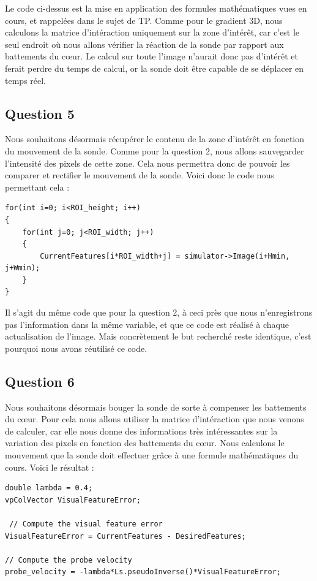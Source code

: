 \documentclass[a4paper,11pt]{article}
\begin{document}
Le code ci-dessus est la mise en application des formules math\'ematiques vues en cours, et rappel\'ees dans le sujet de TP. Comme pour le gradient 3D, nous calculons la matrice d'int\'eraction uniquement sur la zone d'int\'er\^et, car c'est le seul endroit o\`u nous allons v\'erifier la r\'eaction de la sonde par rapport aux battements du c\oe ur. Le calcul sur toute l'image n'aurait donc pas d'int\'er\^et et ferait perdre du temps de calcul, or la sonde doit \^etre capable de se d\'eplacer en temps r\'eel. 

\subsection{Question 5}
Nous souhaitons d\'esormais r\'ecup\'erer le contenu de la zone d'int\'er\^et en fonction du mouvement de la sonde. Comme pour la question 2, nous allons sauvegarder l'intensit\'e des pixels de cette zone. Cela nous permettra donc de pouvoir les comparer et rectifier le mouvement de la sonde. Voici donc le code nous permettant cela :

\begin{verbatim}
for(int i=0; i<ROI_height; i++) 
{
    for(int j=0; j<ROI_width; j++) 
    {
        CurrentFeatures[i*ROI_width+j] = simulator->Image(i+Hmin, j+Wmin);
    }
}
\end{verbatim}

Il s'agit du m\^eme code que pour la question 2, \`a ceci pr\`es que nous n'enregistrons pas l'information dans la m\^eme variable, et que ce code est r\'ealis\'e \`a chaque actualisation de l'image. Mais concr\`etement le but recherch\'e reste identique, c'est pourquoi nous avons r\'eutilis\'e ce code.

\subsection{Question 6}
Nous souhaitons d\'esormais bouger la sonde de sorte \`a compenser les battements du c\oe ur. Pour cela nous allons utiliser la matrice d'int\'eraction que nous venons de calculer, car elle nous donne des informations tr\`es int\'eressantes sur la variation des pixels en fonction des battements du c\oe ur. Nous calculons le mouvement que la sonde doit effectuer gr\^ace \`a une formule math\'ematiques du cours. Voici le r\'esultat : 

\begin{verbatim}
double lambda = 0.4;
vpColVector VisualFeatureError;

 // Compute the visual feature error
VisualFeatureError = CurrentFeatures - DesiredFeatures;

// Compute the probe velocity
probe_velocity = -lambda*Ls.pseudoInverse()*VisualFeatureError; 
\end{verbatim}
\end{document}
